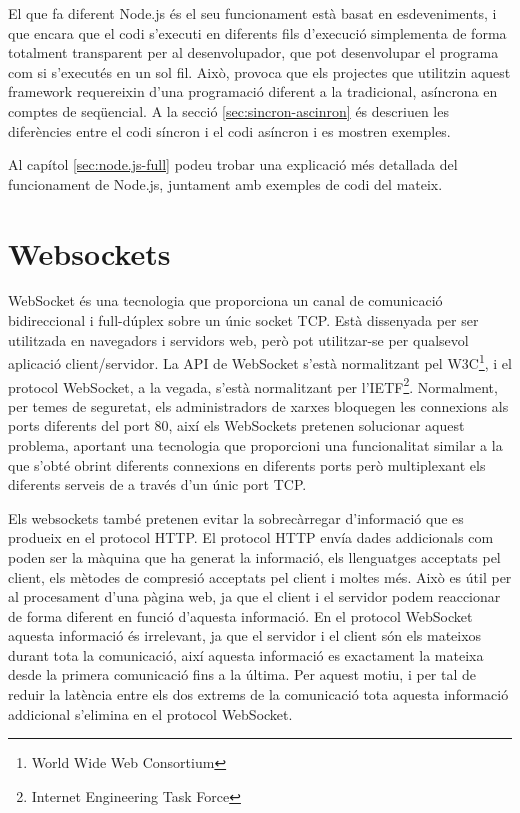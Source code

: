 El que fa diferent Node.js és el seu funcionament està basat en esdeveniments, i que encara que el codi s'executi en diferents fils d'execució simplementa de forma totalment transparent per al desenvolupador, que pot desenvolupar el programa com si s'executés en un sol fil. Això, provoca que els projectes que utilitzin aquest framework requereixin d'una programació diferent a la tradicional, asíncrona en comptes de seqüencial. A la secció \ref{sec:sincron-ascinron} és descriuen les diferències entre el codi síncron i el codi asíncron i es mostren exemples.

Al capítol \ref{sec:node.js-full} podeu trobar una explicació més detallada del funcionament de Node.js, juntament amb exemples de codi del mateix.


\section{Websockets}
\label{sec:websockets}

WebSocket és una tecnologia que proporciona un canal de comunicació bidireccional i full-dúplex sobre un únic socket TCP. Està dissenyada per ser utilitzada en navegadors i servidors web, però pot utilitzar-se per qualsevol aplicació client/servidor. La API de WebSocket s'està normalitzant pel W3C\footnote{World Wide Web Consortium}, i el protocol WebSocket, a la vegada, s'està normalitzant per l'IETF\footnote{Internet Engineering Task Force}. Normalment, per temes de seguretat, els administradors de xarxes bloquegen les connexions als ports diferents del port 80, així els WebSockets pretenen solucionar aquest problema, aportant una tecnologia que proporcioni una funcionalitat similar a la que s'obté obrint diferents connexions en diferents ports però multiplexant els diferents serveis de a través d'un únic port TCP.

Els websockets també pretenen evitar la sobrecàrregar d'informació que es produeix en el protocol HTTP. El protocol HTTP envía dades addicionals com poden ser la màquina que ha generat la informació, els llenguatges acceptats pel client, els mètodes de compresió acceptats pel client i moltes més. Això es útil per al procesament d'una pàgina web, ja que el client i el servidor podem reaccionar de forma diferent en funció d'aquesta informació. En el protocol WebSocket aquesta informació és irrelevant, ja que el servidor i el client són els mateixos durant tota la comunicació, així aquesta informació es exactament la mateixa desde la primera comunicació fins a la última. Per aquest motiu, i per tal de reduir la latència entre els dos extrems de la comunicació tota aquesta informació addicional s'elimina en el protocol WebSocket.


